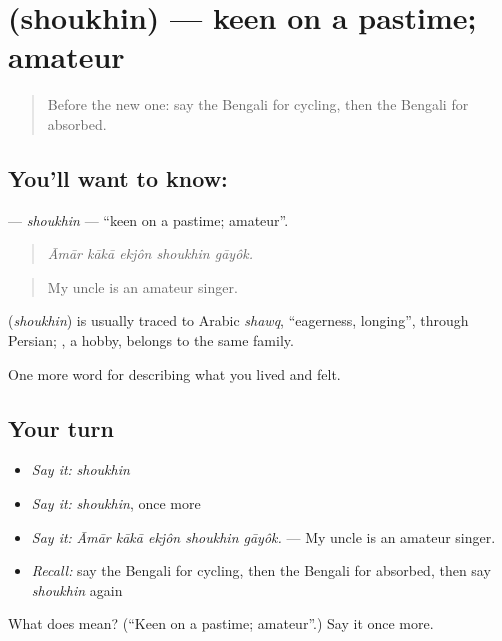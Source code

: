 \section[\texorpdfstring{\bn{শৌখিন} (shoukhin)}{শৌখিন (shoukhin)}]{ (shoukhin) — keen on a pastime; amateur}

\label{lesson:BN-C516-shoukhin}



\begin{quote}
Before the new one: say the Bengali for cycling, then the Bengali for absorbed.
\end{quote}

\subsection*{You'll want to know: }
\textbf{} — \emph{shoukhin} — \textquotedblleft{}keen on a pastime; amateur\textquotedblright{}.

\begin{quote}
    
\end{quote}

\begin{quote}
\emph{Āmār kākā ekjôn shoukhin gāyôk.}
\end{quote}

\begin{quote}
My uncle is an amateur singer.
\end{quote}

\begin{cousinweb}
\textbf{} (\emph{shoukhin}) is usually traced to Arabic \emph{shawq}, \textquotedblleft{}eagerness, longing\textquotedblright{}, through Persian; , a hobby, belongs to the same family.
\end{cousinweb}

\begin{grammarlens}[title={What you've built}]
One more word for describing what you lived and felt.
\end{grammarlens}

\subsection*{Your turn}
\begin{itemize}
\raggedright
  \item \emph{Say it:} \emph{shoukhin}
  \item \emph{Say it:} \emph{shoukhin}, once more
  \item \emph{Say it:} \emph{Āmār kākā ekjôn shoukhin gāyôk.} — My uncle is an amateur singer.
  \item \emph{Recall:} say the Bengali for cycling, then the Bengali for absorbed, then say \emph{shoukhin} again
\end{itemize}

\begin{tcolorbox}[breakable,colback=teal!4,colframe=teal!35!black,title={Before you move on}]
What does  mean? (\textquotedblleft{}Keen on a pastime; amateur\textquotedblright{}.) Say it once more.
\end{tcolorbox}
